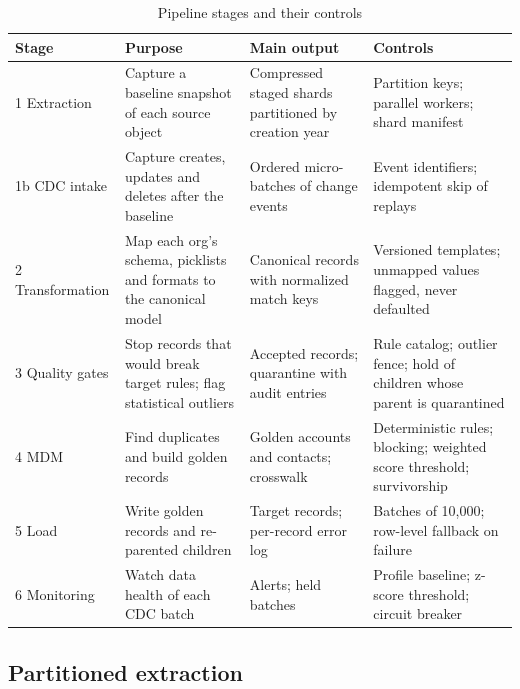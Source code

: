 \begin{table}[!t]
\centering
\caption{Pipeline stages and their controls}
\label{tab:1}
\setlength{\tabcolsep}{4pt}
\renewcommand{\arraystretch}{1.15}
\footnotesize
\begin{tabular}{>{\raggedright\arraybackslash\hspace{0pt}}p{}>{\raggedright\arraybackslash\hspace{0pt}}p{}>{\raggedright\arraybackslash\hspace{0pt}}p{}>{\raggedright\arraybackslash\hspace{0pt}}p{}}
\hline
\textbf{Stage} & \textbf{Purpose} & \textbf{Main output} & \textbf{Controls} \\
\hline
1 Extraction & Capture a baseline snapshot of each source object & Compressed staged shards partitioned by creation year & Partition keys; parallel workers; shard manifest \\
1b CDC intake & Capture creates, updates and deletes after the baseline & Ordered micro-batches of change events & Event identifiers; idempotent skip of replays \\
2 Transformation & Map each org's schema, picklists and formats to the canonical model & Canonical records with normalized match keys & Versioned templates; unmapped values flagged, never defaulted \\
3 Quality gates & Stop records that would break target rules; flag statistical outliers & Accepted records; quarantine with audit entries & Rule catalog; outlier fence; hold of children whose parent is quarantined \\
4 MDM & Find duplicates and build golden records & Golden accounts and contacts; crosswalk & Deterministic rules; blocking; weighted score threshold; survivorship \\
5 Load & Write golden records and re-parented children & Target records; per-record error log & Batches of 10,000; row-level fallback on failure \\
6 Monitoring & Watch data health of each CDC batch & Alerts; held batches & Profile baseline; z-score threshold; circuit breaker \\
\hline
\end{tabular}
\end{table}


\subsection{Partitioned extraction}\label{sec:3.2}

